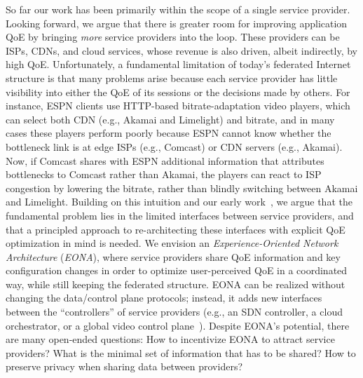 So far our work has been primarily within the scope of a single service provider. Looking 
forward, we argue that there is greater room for improving application QoE by bringing 
{\em more} service providers into the loop. These providers can be ISPs, CDNs, and 
cloud services, whose revenue is also driven, albeit indirectly, by high QoE. Unfortunately, 
a fundamental limitation of today's federated Internet structure is that many problems arise 
because each service provider has little visibility into either the QoE of its sessions or 
the decisions made by others.
For instance, ESPN clients use HTTP-based bitrate-adaptation video players, which can 
select both CDN (e.g., Akamai and Limelight) and bitrate, and in many cases these players 
perform poorly because ESPN cannot know whether the bottleneck link is at edge ISPs 
(e.g., Comcast) or CDN servers (e.g., Akamai).
Now, if Comcast shares with ESPN additional information that attributes bottlenecks to 
Comcast rather than Akamai, the players can react to ISP congestion by lowering the 
bitrate, rather than blindly switching between Akamai and Limelight. 
Building on this intuition and our early work~\cite{eona}, we argue that the fundamental 
problem lies in the limited interfaces between service providers, and that a principled 
approach to re-architecting these interfaces with explicit QoE optimization in mind is needed.
We envision an {\em Experience-Oriented Network Architecture} ({\em EONA}), where 
service providers share QoE information and key configuration changes in order to optimize 
user-perceived QoE in a coordinated way, while still keeping the federated structure.
EONA can be realized without changing the data/control plane protocols; instead, it adds 
new interfaces between the ``controllers'' of service providers (e.g., an SDN controller, 
a cloud orchestrator, or a global video control plane~\cite{sigcomm12}).
Despite EONA's potential, there are many open-ended questions: 
How to incentivize EONA to attract service providers?
What is the minimal set of information that has to be shared? 
How to preserve privacy when sharing data between providers?

